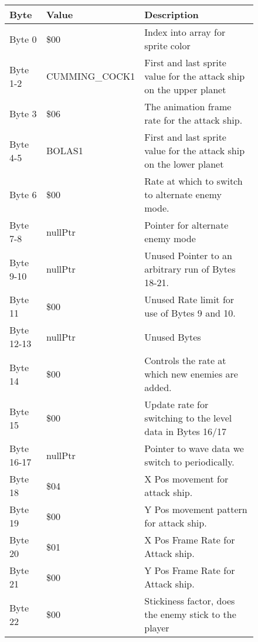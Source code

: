 \begin{figure}[H]
{\begin{adjustbox}{width=12cm}
\begin{tabular}{lll}
\toprule
 Byte       & Value            & Description                                                         \\
\midrule
 Byte 0     & \$00              & Index into array for sprite color                                   \\
 Byte 1-2   & CUMMING\_COCK1    & First and last sprite value for the attack ship on the upper planet \\
 Byte 3     & \$06              & The animation frame rate for the attack ship.                       \\
 Byte 4-5   & BOLAS1           & First and last sprite value for the attack ship on the lower planet \\
 Byte 6     & \$00              & Rate at which to switch to alternate enemy mode.                    \\
 Byte 7-8   & nullPtr          & Pointer for alternate enemy mode                                    \\
 Byte 9-10  & nullPtr          & Unused Pointer to an arbitrary run of Bytes 18-21.                  \\
 Byte 11    & \$00              & Unused Rate limit for use of Bytes 9 and 10.                        \\
 Byte 12-13 & nullPtr          & Unused Bytes                                                        \\
 Byte 14    & \$00              & Controls the rate at which new enemies are added.                   \\
 Byte 15    & \$00              & Update rate for switching to the level data in Bytes 16/17          \\
 Byte 16-17 & nullPtr          & Pointer to wave data we switch to periodically.                     \\
 Byte 18    & \$04              & X Pos movement for attack ship.                                     \\
 Byte 19    & \$00              & Y Pos movement pattern for attack ship.                             \\
 Byte 20    & \$01              & X Pos Frame Rate for Attack ship.                                   \\
 Byte 21    & \$00              & Y Pos Frame Rate for Attack ship.                                   \\
 Byte 22    & \$00              & Stickiness factor, does the enemy stick to the player               \\

\end{tabular}
\end{adjustbox}}
\end{figure}
